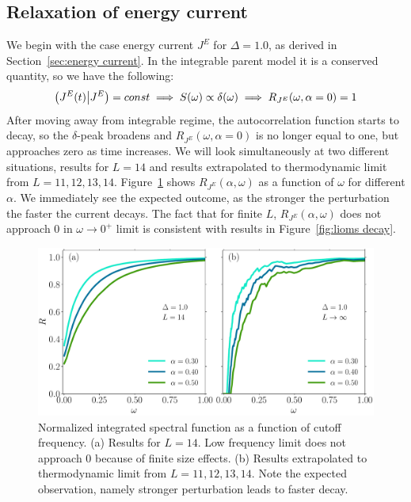 \subsection{Relaxation of energy current}
We begin with the case energy current \(J^E\) for \(\Delta = 1.0\), as derived in Section~\ref{sec:energy current}.
In the integrable parent model it is a conserved quantity, so we have the following:
\begin{equation*}
  \left(J^E(t) \middle| J^E\right) = const \implies S(\omega) \propto \delta(\omega)
  \implies R_{J^E}(\omega,\alpha=0) = 1
\end{equation*}
After moving away from integrable regime, the autocorrelation function starts to decay,
so the \(\delta\)-peak broadens and \(R_{J^E}(\omega,\alpha=0)\) is no longer equal to one,
but approaches zero as time increases. We will look simultaneously at two different situations,
results for \(L=14\) and results extrapolated to thermodynamic limit from \(L=11,12,13,14\). 
Figure~\ref{fig:current decay no scaling} shows \(R_{J^E}(\alpha,\omega)\) as a
function of \(\omega\) for different \(\alpha\). We immediately see the expected outcome, as the
stronger the perturbation the faster the current decays. The fact that for finite \(L\),
\(R_{J^E}(\alpha,\omega)\) does not approach \(0\) in \(\omega\to 0^+\) limit is consistent
with results in Figure~\ref{fig:lioms decay}.
\begin{figure}[htbp]
  \centering
  \includegraphics[width=\textwidth]{Figures/current_no_scaling.pdf}
  \caption{Normalized integrated spectral function as a function of cutoff frequency.
  (a) Results for \(L=14\). Low frequency limit does not approach 0
  because of finite size effects. (b) Results extrapolated to thermodynamic limit from \(L=11,12,13,14\).
  Note the expected observation, namely stronger perturbation leads to faster decay.}
  \label{fig:current decay no scaling}
\end{figure}
